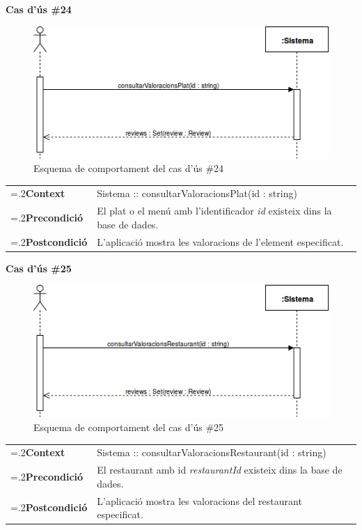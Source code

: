 \noindent\textbf{\large Cas d'ús \#24}\\
\begin{figure}[H]
\centering
\includegraphics[scale=0.6]{Figures/casdus_24.png}
\caption{Esquema de comportament del cas d'ús \#24}
\end{figure}
\begin{table}[h]
\noindent
\begin{tabularx}{\linewidth}{
>{\hsize=.2\hsize}X%
>{\hsize=0.8\hsize}X%
}
\textbf{Context} 		& Sistema :: consultarValoracionsPlat(id : string) \\
\textbf{Precondició} 	& El plat o el menú amb l'identificador \textit{id} existeix dins la base de dades. \\
\textbf{Postcondició}	& L'aplicació mostra les valoracions de l'element especificat. \\
\end{tabularx}
\label{}
\end{table}

\clearpage
\noindent\textbf{\large Cas d'ús \#25}\\
\begin{figure}[H]
\centering
\includegraphics[scale=0.6]{Figures/casdus_25.png}
\caption{Esquema de comportament del cas d'ús \#25}
\end{figure}
\begin{table}[h]
\noindent
\begin{tabularx}{\linewidth}{
>{\hsize=.2\hsize}X%
>{\hsize=0.8\hsize}X%
}
\textbf{Context} 		& Sistema :: consultarValoracionsRestaurant(id : string) \\
\textbf{Precondició} 	& El restaurant amb id \textit{restaurantId} existeix dins la base de dades. \\
\textbf{Postcondició}	& L'aplicació mostra les valoracions del restaurant especificat. \\
\end{tabularx}
\label{}
\end{table}
